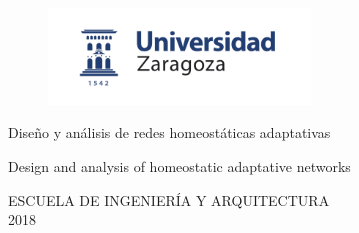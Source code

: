 \documentclass[a4paper,12pt,twoside,hidelinks,openany]{report}
\begin{document}

\begin{titlepage}

\vspace*{-4mm}
\begin{figure}[!h]
  \centering
	\includegraphics[width=69.62mm]{Imagenes/UnizarLogo}
\end{figure}

\vspace*{17mm}

\fontsize{28pt}{28pt}\selectfont
\begin{center}
\setlength{\fboxsep}{3.4mm}
\end{center}

\vspace*{18.7mm}


\fontsize{20pt}{20pt}\selectfont
\begin{center}
Diseño y análisis de redes homeostáticas adaptativas
\end{center}
\baselineskip 20pt
\begin{center}
Design and analysis of homeostatic adaptative networks
\end{center}

\vspace*{0cm}
\baselineskip 36pt
\begin{center}
\fontsize{12pt}{12pt}\selectfont
{}

\vspace*{3.65mm}
\fontsize{18pt}{18pt}\selectfont
{}
\vspace*{1cm}
\baselineskip 36pt
\fontsize{12pt}{12pt}\selectfont
{}
\vspace*{3.56mm}
\fontsize{14pt}{14pt}\selectfont
{}
\end{center}

\setcounter{footnote}{1}

\vspace*{16.45mm}
\fontsize{12pt}{12pt}\selectfont
\begin{center}
ESCUELA DE INGENIERÍA Y ARQUITECTURA\\
2018\\
\end{center}


\renewcommand{\thefootnote}{\arabic{footnote}}
\end{titlepage}
\newpage
\end{document}
